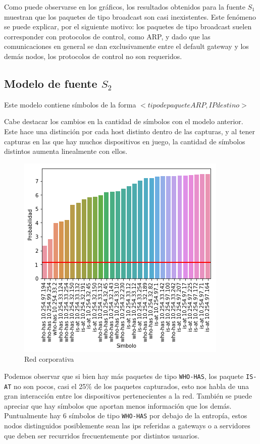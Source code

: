 Como puede observarse en los gráficos, los resultados obtenidos para la fuente $S_1$ muestran que los paquetes de tipo broadcast son casi inexistentes. Este fenómeno se puede explicar, por el siguiente motivo: los paquetes de tipo broadcast suelen corresponder con protocolos de control, como ARP, y dado que las comunicaciones en general se dan exclusivamente entre el default gateway y los demás nodos, los protocolos de control no son requeridos.

\subsection{Modelo de fuente \texorpdfstring{$S_2$}{S2}}

Este modelo contiene símbolos de la forma $< tipo de paquete ARP, IP destino >$

Cabe destacar los cambios en la cantidad de símbolos con el modelo anterior. Este hace una distinción por cada host distinto dentro de las capturas, y al tener capturas en las que hay muchos dispositivos en juego, la cantidad de símbolos distintos aumenta linealmente con ellos.

\begin{figure}[H]
	\centering
	\includegraphics[width=.5\linewidth]{imagenes/despegar_hosts}
	\caption{Red corporativa}
\end{figure}

Podemos observar que si bien hay más paquetes de tipo \texttt{WHO-HAS}, los paquete \texttt{IS-AT} no son pocos, casi el 25\% de los paquetes capturados, esto nos habla de una gran interacción entre los dispositivos pertenecientes a la red. También se puede apreciar que hay símbolos que aportan menos información que los demás. Puntualmente hay 6 símbolos de tipo \texttt{WHO-HAS} por debajo de la entropía, estos nodos distinguidos posiblemente sean las ips referidas a gateways o a servidores que deben ser recurridos frecuentemente por distintos usuarios.


